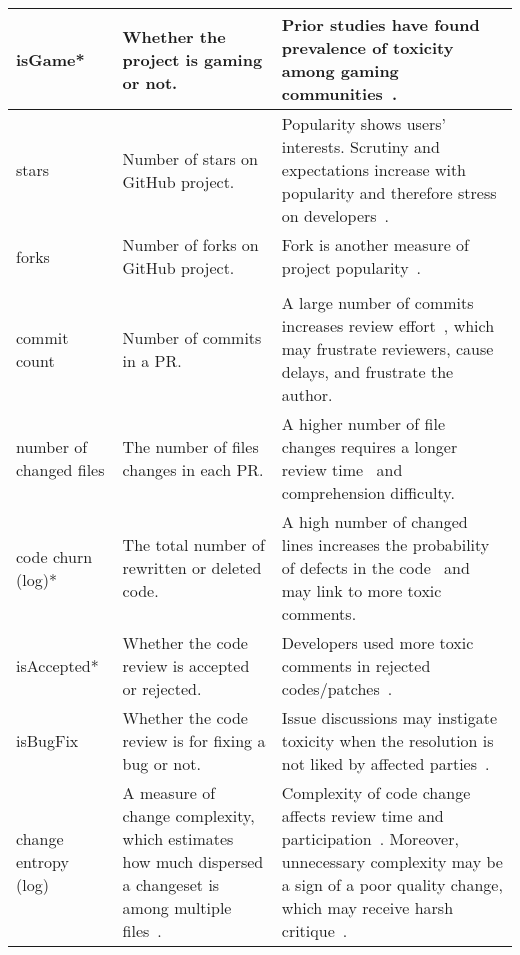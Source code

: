 {\begin{tabular}{|p{1.9cm}|p{5.5cm}|p{11.2cm}|}
isGame* & Whether the project is gaming or not. & Prior studies have found prevalence of toxicity among gaming communities~\cite{miller2022did,belskie2023measuring,paul2018toxic,beres2021don}.    \\  \hline



stars & Number of stars on GitHub project. &  Popularity shows users' interests. Scrutiny and expectations increase with popularity and therefore stress on developers~\cite{raman2020stress}.   \\  \hline

forks & Number of forks on GitHub project. & Fork is another measure of project popularity~\cite{zhou2020has}. \\  \hline

\rowcolor[gray]{.8}
\multicolumn{3}{l}{ \textbf{RQ3: PR Context}}\\ \hline

commit count & Number of commits in a PR. & A large number of commits increases review effort~\cite{thongtanunam2017review}, which may frustrate reviewers, cause delays, and frustrate the author.  \\  \hline



number of changed files & The number of files changes in each PR. & A higher number of file changes requires a longer review time~\cite{review_2} and comprehension difficulty.
  
\\  \hline


  

code churn (log)* & The total number of rewritten or deleted code. & A high number of changed lines increases the probability of defects in the code~\cite{nagappan2005use,nagappan2007using} and may link to more toxic comments.  \\  \hline


isAccepted* & Whether the code review is accepted or rejected. & Developers used more toxic comments in rejected codes/patches~\cite{ferreira2021shut}.     \\  \hline

isBugFix & Whether the code review is for fixing a bug or not. & Issue discussions may instigate toxicity when the resolution is not liked by affected parties~\cite{ferreira2022heated,miller2022did}.    \\  \hline

change entropy (log) & A measure of change complexity, which estimates how much dispersed a changeset is among multiple files~\cite{thongtanunam2017review}. & Complexity of code change affects review time and participation~\cite{thongtanunam2017review}. Moreover, unnecessary complexity may be a sign of a poor quality change, which may receive harsh critique~\cite{rahman2024words}. \\  \hline


\end{tabular}}
